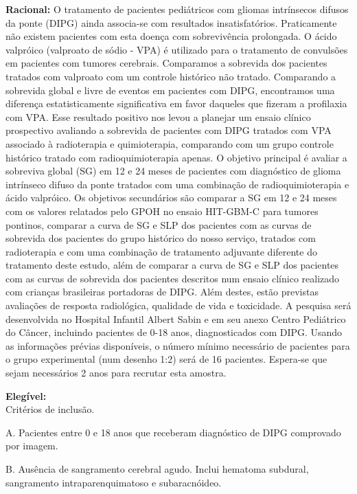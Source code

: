 \documentclass[11pt,a4paper,oldfontcommands]{memoir}
\begin{document}
\textbf{Racional:} O tratamento de pacientes pediátricos com gliomas intrínsecos difusos da
ponte (DIPG) ainda associa-se com resultados insatisfatórios.
Praticamente não existem pacientes com esta doença com sobrevivência
prolongada. O ácido valpróico (valproato de sódio - VPA) é utilizado
para o tratamento de convulsões em pacientes com tumores cerebrais.
Comparamos a sobrevida dos pacientes tratados com valproato com um
controle histórico não tratado. Comparando a sobrevida global e livre de
eventos em pacientes com DIPG, encontramos uma diferença
estatisticamente significativa em favor daqueles que fizeram a
profilaxia com VPA. Esse resultado positivo nos levou a planejar um
ensaio clínico prospectivo avaliando a sobrevida de pacientes com DIPG
tratados com VPA associado à radioterapia e quimioterapia, comparando
com um grupo controle histórico tratado com radioquimioterapia apenas. O
objetivo principal é avaliar a sobreviva global (SG) em 12 e 24 meses de
pacientes com diagnóstico de glioma intrínseco difuso da ponte tratados
com uma combinação de radioquimioterapia e ácido valpróico. Os objetivos
secundários são comparar a SG em 12 e 24 meses com os valores relatados
pelo GPOH no ensaio HIT-GBM-C para tumores pontinos, comparar a curva de
SG e SLP dos pacientes com as curvas de sobrevida dos pacientes do grupo
histórico do nosso serviço, tratados com radioterapia e com uma
combinação de tratamento adjuvante diferente do tratamento deste estudo,
além de comparar a curva de SG e SLP dos pacientes com as curvas de
sobrevida dos pacientes descritos num ensaio clínico realizado com
crianças brasileiras portadoras de DIPG. Além destes, estão previstas
avaliações de resposta radiológica, qualidade de vida e toxicidade. A
pesquisa será desenvolvida no Hospital Infantil Albert Sabin e em seu
anexo Centro Pediátrico do Câncer, incluindo pacientes de 0-18 anos,
diagnosticados com DIPG. Usando as informações prévias disponíveis, o
número mínimo necessário de pacientes para o grupo experimental (num
desenho 1:2) será de 16 pacientes. Espera-se que sejam necessários 2
anos para recrutar esta amostra.

\textbf{Elegível:} \\

Critérios de inclusão.

A. Pacientes entre 0 e 18 anos que receberam diagnóstico de DIPG
comprovado por imagem.

B. Ausência de sangramento cerebral agudo. Inclui hematoma subdural,
sangramento intraparenquimatoso e subaracnóideo.
\end{document}

